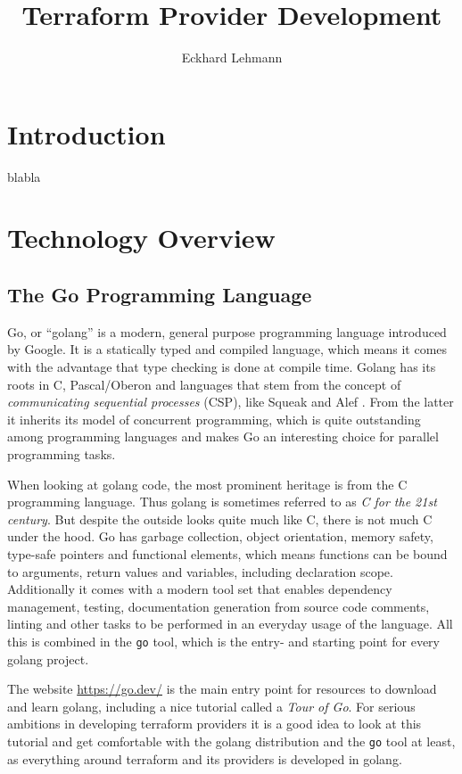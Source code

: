 \documentclass[paper=a4,fontsize=10pt,toc=listof,numbers=noenddot]{article}
\title{Terraform Provider Development}
\author{Eckhard Lehmann}
\begin{document}
\maketitle
\tableofcontents

\section{Introduction}

blabla

\section{Technology Overview}
\label{sec:technology-overview}


\subsection{The Go Programming Language}
\label{subsec:go-progr-lang}

Go, or ``golang'' is a modern, general purpose programming language introduced by Google. It is a statically typed and compiled language, which means it comes with the advantage that type checking is done at compile time. Golang has its roots in C, Pascal/Oberon and languages that stem from the concept of \emph{communicating sequential processes} (CSP), like Squeak and Alef \cite{donovan_go_2016}. From the latter it inherits its model of concurrent programming, which is quite outstanding among programming languages and makes Go an interesting choice for parallel programming tasks.

When looking at golang code, the most prominent heritage is from the C programming language. Thus golang is sometimes referred to as \emph{C for the 21st century}. But despite the outside looks quite much like C, there is not much C under the hood. Go has garbage collection, object orientation, memory safety, type-safe pointers and functional elements, which means functions can be bound to arguments, return values and variables, including declaration scope. Additionally it comes with a modern tool set that enables dependency management, testing, documentation generation from source code comments, linting and other tasks to be performed in an everyday usage of the language. All this is combined in the \verb'go' tool, which is the entry- and starting point for every golang project.

The website \url{https://go.dev/} is the main entry point for resources to download and learn golang, including a nice tutorial called a \emph{Tour of Go}. For serious ambitions in developing terraform providers it is a good idea to look at this tutorial and get comfortable with the golang distribution and the \verb'go' tool at least, as everything around terraform and its providers is developed in golang.
\end{document}

